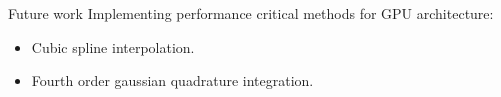 \begin{frame}[plain]
 \begin{block}{Future work}
   Implementing performance critical methods
   for GPU architecture:
   \begin{itemize}
     \item Cubic spline interpolation.
     \item Fourth order gaussian quadrature integration.
   \end{itemize}
 \end{block}
\end{frame}
